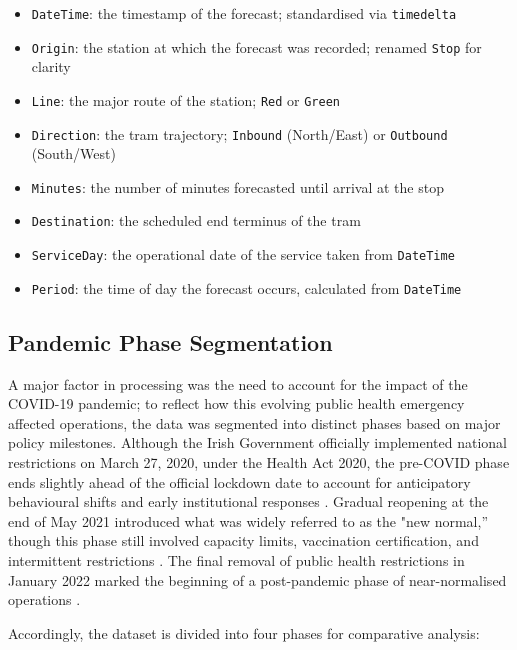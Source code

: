\begin{itemize}
  \item \texttt{DateTime}: the timestamp of the forecast; standardised via \texttt{timedelta}
  \item \texttt{Origin}: the station at which the forecast was recorded; renamed \texttt{Stop} for clarity
  \item \texttt{Line}: the major route of the station; \texttt{Red} or \texttt{Green}
  \item \texttt{Direction}: the tram trajectory; \texttt{Inbound} (North/East) or \texttt{Outbound} (South/West)
  \item \texttt{Minutes}: the number of minutes forecasted until arrival at the stop
  \item \texttt{Destination}: the scheduled end terminus of the tram
  \item \texttt{ServiceDay}: the operational date of the service taken from \texttt{DateTime}
  \item \texttt{Period}: the time of day the forecast occurs, calculated from \texttt{DateTime}
\end{itemize}

\subsection*{Pandemic Phase Segmentation}

    A major factor in processing was the need to account for the impact of the COVID-19 pandemic; to reflect how this evolving public health emergency affected operations, the data was segmented into distinct phases based on major policy milestones. Although the Irish Government officially implemented national restrictions on March 27, 2020, under the Health Act 2020, the pre-COVID phase ends slightly ahead of the official lockdown date to account for anticipatory behavioural shifts and early institutional responses \parencites{govireland2020a}{govireland2020b}. Gradual reopening at the end of May 2021 introduced what was widely referred to as the "new normal,” though this phase still involved capacity limits, vaccination certification, and intermittent restrictions \parencite{govireland2021}. The final removal of public health restrictions in January 2022 marked the beginning of a post-pandemic phase of near-normalised operations \parencites{govireland2022}{depthealth2022}.

    Accordingly, the dataset is divided into four phases for comparative analysis:

